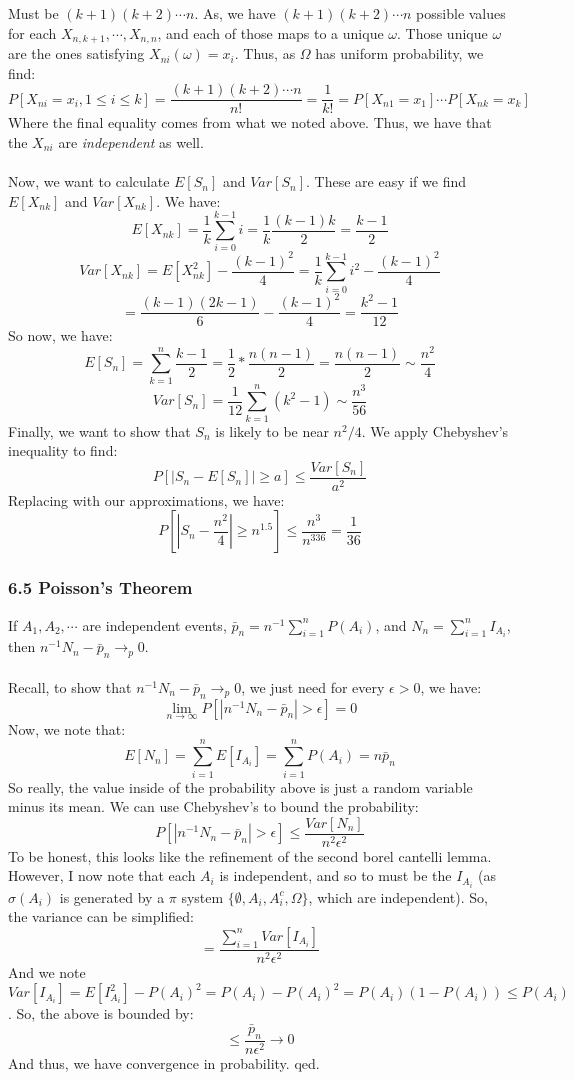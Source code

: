 \documentclass[12pt,a4paper]{article}
\newcommand{\1}[1]{\mathbbm{1}\left\{ #1 \right\}}
\begin{document}
Must be $(k + 1)(k + 2) \cdots n$. As, we have $(k + 1)(k + 2) \cdots n$ possible values for each $X_{n,k+1}, \cdots, X_{n,n}$, and each of those maps to a unique $\omega$. Those unique $\omega$ are the ones satisfying $X_{ni}(\omega) = x_i$. Thus, as $\Omega$ has uniform probability, we find:
$$
	P[X_{ni} = x_i, 1 \leq i \leq k] = \frac{(k + 1)(k + 2) \cdots n}{n!} = \frac{1}{k!} =
	P[X_{n1} = x_1] \cdots P[X_{nk} = x_k]
$$
Where the final equality comes from what we noted above. Thus, we have that the $X_{ni}$ are \textit{independent} as well.
\\\\
Now, we want to calculate $E[S_n]$ and $Var[S_n]$. These are easy if we find $E[X_{nk}]$ and $Var[X_{nk}]$. We have:
$$
	E[X_{nk}] = \frac{1}{k}\sum_{i=0}^{k-1} i = \frac{1}{k}\frac{(k-1)k}{2} = \frac{k-1}{2}
$$
$$
	Var[X_{nk}] = E[X_{nk}^2] - \frac{(k-1)^2}{4} = \frac{1}{k}\sum_{i=0}^{k-1} i^2 - \frac{(k-1)^2}{4}
$$
$$
	= \frac{(k-1)(2k-1)}{6} - \frac{(k-1)^2}{4} = \frac{k^2 - 1}{12}
$$
So now, we have:
$$
	E[S_n] = \sum_{k=1}^n \frac{k-1}{2} = \frac{1}{2} * \frac{n(n-1)}{2} = \frac{n(n-1)}{2} \sim \frac{n^2}{4}
$$
$$
	Var[S_n] = \frac{1}{12} \sum_{k=1}^n (k^2 - 1) \sim \frac{n^3}{56}
$$
Finally, we want to show that $S_n$ is likely to be near $n^2/4$. We apply Chebyshev's inequality to find:
$$
	P[|S_n - E[S_n]| \geq a] \leq \frac{Var[S_n]}{a^2}
$$
Replacing with our approximations, we have:
$$
	P\left[\left|S_n - \frac{n^2}{4}\right| \geq n^{1.5}\right] \leq \frac{n^3}{n^336} = \frac{1}{36}
$$

\subsubsection{6.5 Poisson's Theorem} If $A_1, A_2, \cdots$ are independent events, $\bar{p}_n = n^{-1}\sum_{i=1}^n P(A_i)$, and $N_n = \sum_{i=1}^n I_{A_i}$, then $n^{-1}N_n - \bar{p}_n \to_p 0$.
\\\\
Recall, to show that $n^{-1}N_n - \bar{p}_n \to_p 0$, we just need for every $\epsilon > 0$, we have:
$$
	\lim_{n \to \infty} P\left[\left|n^{-1}N_n - \bar{p}_n\right| > \epsilon\right] = 0
$$
Now, we note that:
$$
	E[N_n] = \sum_{i=1}^n E[I_{A_i}] = \sum_{i=1}^n P(A_i) = n\bar{p}_n
$$
So really, the value inside of the probability above is just a random variable minus its mean. We can use Chebyshev's to bound the probability:
$$
	P\left[\left|n^{-1}N_n - \bar{p}_n\right| > \epsilon\right] \leq
	\frac{Var[N_n]}{n^2\epsilon^2}
$$
To be honest, this looks like the refinement of the second borel cantelli lemma. However, I now note that each $A_i$ is independent, and so to must be the $I_{A_i}$ (as $\sigma(A_i)$ is generated by a $\pi$ system $\{\emptyset, A_i, A_i^c, \Omega\}$, which are independent). So, the variance can be simplified:
$$
	= \frac{\sum_{i=1}^n Var[I_{A_i}]}{n^2\epsilon^2}
$$
And we note $Var[I_{A_i}] = E[I_{A_i}^2] - P(A_i)^2 = P(A_i) - P(A_i)^2 = P(A_i)(1 - P(A_i)) \leq P(A_i)$. So, the above is bounded by:
$$
	\leq \frac{\bar{p}_n}{n\epsilon^2} \to 0
$$
And thus, we have convergence in probability. qed.
\end{document}
